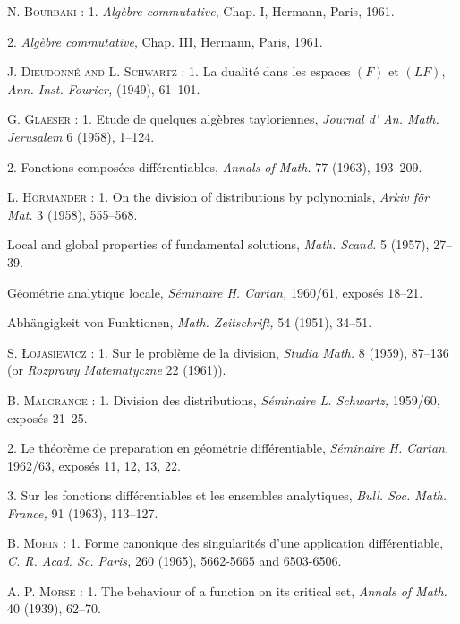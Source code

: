 \begin{thebibliography}{99}
 \textsc{N. Bourbaki} : 1. {\em Alg\`ebre commutative}, Chap. I, Hermann, Paris, 1961.

 2. {\em Alg\`ebre commutative}, Chap. III, Hermann, Paris, 1961.

 \textsc{J. Dieudonn\'e and L. Schwartz :} 1. La dualit\'e dans les espaces $(F)$ et $(LF)$, {\em Ann. Inst. Fourier,} (1949), 61--101.

 \textsc{G. Glaeser} : 1. Etude de quelques alg\`ebres tayloriennes, {\em Journal d' An. Math. Jerusalem} 6 (1958), 1--124.

 2. Fonctions compos\'ees diff\'erentiables, {\em Annals of Math.} 77 (1963), 193--209.

 \textsc{L. H\"ormander} : 1. On the division of distributions by polynomials, {\em Arkiv f\"or Mat.} 3 (1958), 555--568.

 Local and global properties of fundamental solutions, {\em Math. Scand.} 5 (1957), 27--39.

 G\'eom\'etrie analytique locale, {\em S\'eminaire H. Cartan,} 1960/61, expos\'es 18--21.

 Abh\"angigkeit von Funktionen, {\em Math. Zeitschrift,} 54 (1951), 34--51.

 \textsc{S. {\L}ojasiewicz} : 1. Sur le probl\`eme de la division, {\em Studia Math.} 8 (1959), 87--136 (or {\em Rozprawy Matematyczne} 22 (1961)).

 \textsc{B. Malgrange} : 1. Division des distributions, {\em S\'eminaire L. Schwartz,} 1959/60, expos\'es 21--25.

 2. Le th\'eor\`eme de preparation en g\'eom\'etrie diff\'erentiable, {\em S\'eminaire H. Cartan,} 1962/63, expos\'es 11, 12, 13, 22.

 3. Sur les fonctions diff\'erentiables et les ensembles analytiques, {\em Bull. Soc. Math. France,} 91 (1963), 113--127.

 \textsc{B. Morin} : 1. Forme canonique des singularit\'es d'une application diff\'erentiable, {\em C. R. Acad. Sc. Paris,} 260 (1965), 5662-5665 and 6503-6506.

 \textsc{A. P. Morse} : 1. The behaviour of a function on its critical set, {\em Annals of Math.} 40 (1939), 62--70.


\end{thebibliography}
